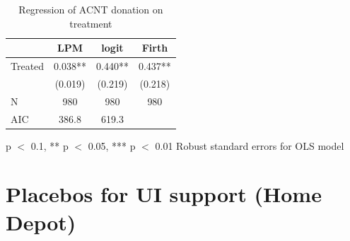 \documentclass[
  11pt,
  oneside]{article}
\begin{document}
\begin{table}
\centering
\caption{\label{tab:fig-emerg-donate}Regression of ACNT donation on treatment  \label{tab:tab-donate-models-wmt-app}}
\centering
\begin{threeparttable}
\begin{tabular}[t]{lccc}
\toprule
  & LPM & logit & Firth\\
\midrule
Treated & \num{0.038}** & \num{0.440}** & \num{0.437}**\\
 & (\num{0.019}) & (\num{0.219}) & (\num{0.218})\\
\midrule
N & \num{980} & \num{980} & \num{980}\\
AIC & \num{386.8} & \num{619.3} & \\
\bottomrule
\end{tabular}
\begin{tablenotes}
\item * p $<$ 0.1, ** p $<$ 0.05, *** p $<$ 0.01 Robust standard errors for OLS model
\end{tablenotes}
\end{threeparttable}
\end{table}

\FloatBarrier

\section{Placebos for UI support (Home Depot)}\label{app-placebo}
\end{document}
